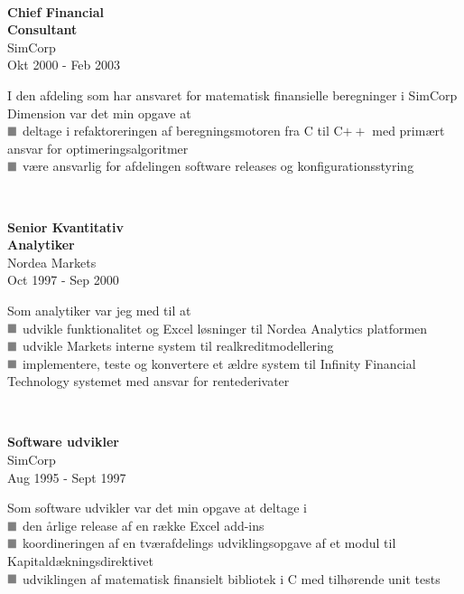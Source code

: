 \documentclass[10pt, a4paper]{article}
\newcommand*{\greysquare}{\textcolor{gray}{\blacksquare}}
\begin{document}
\\[0.5cm]
\begin{Row}%
  \begin{Cell}{1}
    \textbf{Chief Financial \\
    Consultant} \\ [1ex]
    SimCorp \\ 
    Okt 2000 - Feb 2003  
  \end{Cell}
  \begin{Cell}{3}
    I den afdeling som har ansvaret for matematisk finansielle beregninger i SimCorp Dimension var det min opgave at \\ [1ex]
    $\greysquare$ deltage i refaktoreringen af beregningsmotoren fra C til C$++$ med primært ansvar for optimeringsalgoritmer \\
    $\greysquare$ være ansvarlig for afdelingen software releases og konfigurationsstyring
  \end{Cell}
\end{Row}
\\[0.5cm]
\begin{Row}%
  \begin{Cell}{1}
    \textbf{Senior Kvantitativ \\
    Analytiker} \\ [1ex]
    Nordea Markets \\ 
    Oct 1997 - Sep 2000  
  \end{Cell}
  \begin{Cell}{3}
    Som analytiker var jeg med til at \\ [1ex]
    $\greysquare$ udvikle funktionalitet og Excel løsninger til Nordea Analytics platformen \\
    $\greysquare$ udvikle Markets interne system til realkreditmodellering \\
    $\greysquare$ implementere, teste og konvertere et ældre system til Infinity Financial Technology systemet med ansvar for rentederivater
  \end{Cell}
\end{Row}
\\[0.5cm]
\begin{Row}%
  \begin{Cell}{1}
    \textbf{Software udvikler} \\ [1ex]
    SimCorp \\ 
    Aug 1995 - Sept 1997 
  \end{Cell}
  \begin{Cell}{3}
    Som software udvikler var det min opgave at deltage i \\ [1ex]
    $\greysquare$ den årlige release af en række Excel add-ins \\
    $\greysquare$ koordineringen af en tværafdelings udviklingsopgave af et modul til Ka\-pi\-tal\-dæk\-nings\-di\-rek\-ti\-vet \\
    $\greysquare$ udviklingen af matematisk finansielt bibliotek i C med tilhørende unit tests
  \end{Cell}
\end{Row}
\end{document}
